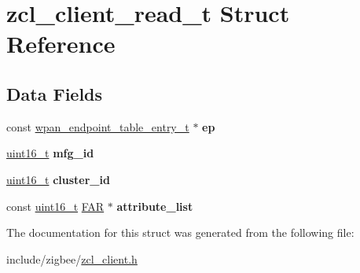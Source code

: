 \hypertarget{structzcl__client__read__t}{\section{zcl\-\_\-client\-\_\-read\-\_\-t Struct Reference}
\label{structzcl__client__read__t}
}
\subsection*{Data Fields}
\begin{DoxyCompactItemize}
\item 
\hypertarget{group__zcl__client_ga459df22e40148e87ee6e57ec5cc3233a}{const \hyperlink{structwpan__endpoint__table__entry__t}{wpan\-\_\-endpoint\-\_\-table\-\_\-entry\-\_\-t} $\ast$ {\bfseries ep}}\label{group__zcl__client_ga459df22e40148e87ee6e57ec5cc3233a}

\item 
\hypertarget{group__zcl__client_ga2ca485436d30af714cc277eaac216cae}{\hyperlink{group__hal_ga5a8b2dc9e45a9ee81a94ef304fb62505}{uint16\-\_\-t} {\bfseries mfg\-\_\-id}}\label{group__zcl__client_ga2ca485436d30af714cc277eaac216cae}

\item 
\hypertarget{group__zcl__client_ga262a92f94287e77cb56350951893bae2}{\hyperlink{group__hal_ga5a8b2dc9e45a9ee81a94ef304fb62505}{uint16\-\_\-t} {\bfseries cluster\-\_\-id}}\label{group__zcl__client_ga262a92f94287e77cb56350951893bae2}

\item 
\hypertarget{group__zcl__client_ga4dc4f61b6b33cb99330d56098bb9bf2a}{const \hyperlink{group__hal_ga5a8b2dc9e45a9ee81a94ef304fb62505}{uint16\-\_\-t} \hyperlink{group__hal_gaef060b3456fdcc093a7210a762d5f2ed}{F\-A\-R} $\ast$ {\bfseries attribute\-\_\-list}}\label{group__zcl__client_ga4dc4f61b6b33cb99330d56098bb9bf2a}

\end{DoxyCompactItemize}


The documentation for this struct was generated from the following file\-:\begin{DoxyCompactItemize}
\item 
include/zigbee/\hyperlink{zcl__client_8h}{zcl\-\_\-client.\-h}\end{DoxyCompactItemize}
